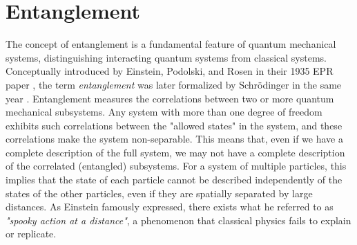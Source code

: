 \documentclass{subfiles}
\begin{document}
\section{Entanglement}
The concept of entanglement is a fundamental feature of quantum mechanical systems, distinguishing interacting quantum systems from classical systems. Conceptually introduced by Einstein, Podolski, and Rosen in their 1935 EPR paper \cite{EPR_1935}, the term \emph{entanglement} was later formalized by Schrödinger in the same year \cite{Schrödinger_1935}. Entanglement measures the correlations between two or more quantum mechanical subsystems. Any system with more than one degree of freedom exhibits such correlations between the "allowed states" in the system, and these correlations make the system non-separable. This means that, even if we have a complete description of the full system, we may not have a complete description of the correlated (entangled) subsystems. For a system of multiple particles, this implies that the state of each particle cannot be described independently of the states of the other particles, even if they are spatially separated by large distances. As Einstein famously expressed, there exists what he referred to as \emph{"spooky action at a distance"}, a phenomenon that classical physics fails to explain or replicate.\\ \\
\end{document}
